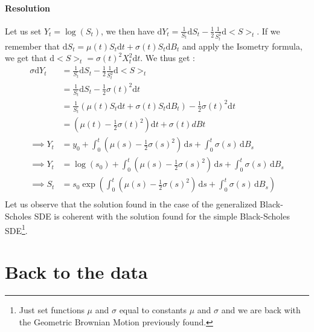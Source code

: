 \paragraph{Resolution}
Let us set $Y_t = \log(S_t)$, we then have $\mathrm{d}Y_t = \frac{1}{S_t}\mathrm{d}S_t -\frac{1}{2} \frac{1}{S_t^2} \mathrm{d}<S>_t$. If we remember that $\mathrm{d}S_t = \mu(t) S_t \mathrm{d}t + \sigma(t) S_t \mathrm{d}B_t$ and apply the Isometry formula, we get that $\mathrm{d}<S>_t = \sigma(t)^2 X_t^2 \mathrm{d}t$. We thus get : \newline
\begin{equation}
\begin{alignat*}{2}
\sigma \mathrm{d}Y_t &= \frac{1}{S_t} \mathrm{d}S_t - \frac{1}{2} \frac{1}{S_t^2} \mathrm{d}<S>_t \\
&=  \frac{1}{S_t} \mathrm{d}S_t - \frac{1}{2} \sigma(t)^2 \mathrm{d}t \\
&=  \frac{1}{S_t} (\mu(t) S_t \mathrm{d}t + \sigma(t) S_t \mathrm{d}B_t)- \frac{1}{2} \sigma(t)^2 \mathrm{d}t \\
 &= (\mu(t) - \frac{1}{2} \sigma(t)^2) \mathrm{d}t + \sigma(t) dBt \\
\implies Y_t &= y_0 + \int_0^t \! (\mu(s) - \frac{1}{2} \sigma(s)^2) \, \mathrm{d}s + \int_0^t \! \sigma(s) \, \mathrm{d}B_s \\
\implies Y_t &= \log(s_0) + \int_0^t \! (\mu(s) - \frac{1}{2} \sigma(s)^2) \, \mathrm{d}s + \int_0^t \! \sigma(s) \, \mathrm{d}B_s \\
\implies S_t &= s_0 \exp(\int_0^t \! (\mu(s) - \frac{1}{2} \sigma(s)^2) \, \mathrm{d}s + \int_0^t \! \sigma(s) \, \mathrm{d}B_s)  \\
\end{alignat*}
\end{equation}\newline
Let us observe that the solution found in the case of the generalized Black-Scholes SDE is coherent with the solution found for the simple Black-Scholes SDE\footnote{Just set functions $\mu$ and $\sigma$ equal to constants $\mu$ and $\sigma$ and we are back with the Geometric Brownian Motion previously found. }.

\section{Back to the data}

